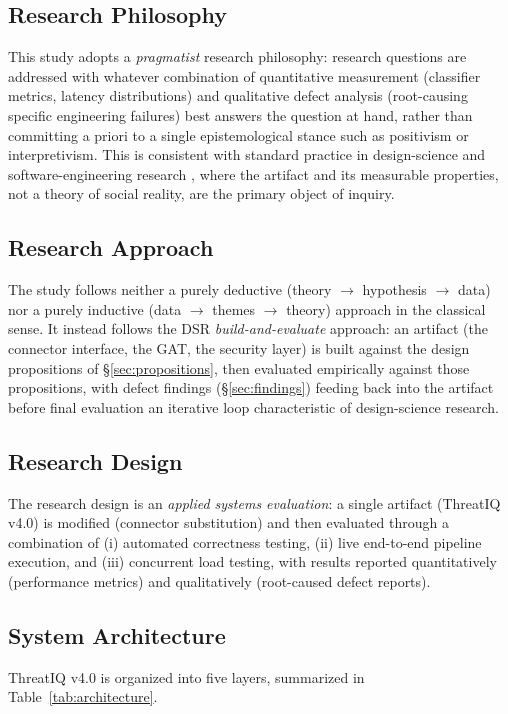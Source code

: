 \documentclass[conference]{IEEEtran}
\begin{document}
\subsection{Research Philosophy}
This study adopts a \emph{pragmatist} research philosophy: research questions are addressed with whatever combination of quantitative measurement (classifier metrics, latency distributions) and qualitative defect analysis (root-causing specific engineering failures) best answers the question at hand, rather than committing a priori to a single epistemological stance such as positivism or interpretivism. This is consistent with standard practice in design-science and software-engineering research \cite{hevner2004design}, where the artifact and its measurable properties, not a theory of social reality, are the primary object of inquiry.

\subsection{Research Approach}
The study follows neither a purely deductive (theory $\rightarrow$ hypothesis $\rightarrow$ data) nor a purely inductive (data $\rightarrow$ themes $\rightarrow$ theory) approach in the classical sense. It instead follows the DSR \emph{build-and-evaluate} approach: an artifact (the connector interface, the GAT, the security layer) is built against the design propositions of \S\ref{sec:propositions}, then evaluated empirically against those propositions, with defect findings (\S\ref{sec:findings}) feeding back into the artifact before final evaluation \textemdash{} an iterative loop characteristic of design-science research.

\subsection{Research Design}
The research design is an \emph{applied systems evaluation}: a single artifact (ThreatIQ v4.0) is modified (connector substitution) and then evaluated through a combination of (i) automated correctness testing, (ii) live end-to-end pipeline execution, and (iii) concurrent load testing, with results reported quantitatively (performance metrics) and qualitatively (root-caused defect reports).

\subsection{System Architecture}
\label{sec:architecture}
ThreatIQ v4.0 is organized into five layers, summarized in Table~\ref{tab:architecture}.
\end{document}
